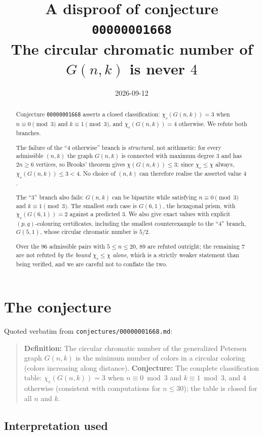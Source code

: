 \documentclass[11pt]{article}
\title{A disproof of conjecture \texttt{00000001668}\\
\large\upshape The circular chromatic number of $G(n,k)$ is never $4$}
\author{}
\date{2026-09-12}
\theoremstyle{definition}
\newcommand{\chic}{\chi_c}
\newcommand{\Gn}{G(n,k)}
\begin{document}
\maketitle

\begin{abstract}
Conjecture \texttt{00000001668} asserts a closed classification:
$\chic(\Gn) = 3$ when $n \equiv 0 \pmod 3$ and $k \equiv 1 \pmod 3$, and
$\chic(\Gn) = 4$ otherwise. We refute both branches.

The failure of the ``$4$ otherwise'' branch is \emph{structural}, not
arithmetic: for every admissible $(n,k)$ the graph $\Gn$ is connected with
maximum degree $3$ and has $2n \ge 6$ vertices, so Brooks' theorem gives
$\chi(\Gn) \le 3$; since $\chic \le \chi$ always, $\chic(\Gn) \le 3 < 4$. No
choice of $(n,k)$ can therefore realise the asserted value $4$.

The ``$3$'' branch also fails: $\Gn$ can be bipartite while satisfying
$n \equiv 0 \pmod 3$ and $k \equiv 1 \pmod 3$. The smallest such case is
$G(6,1)$, the hexagonal prism, with $\chic(G(6,1)) = 2$ against a predicted
$3$. We also give exact values with explicit $(p,q)$-colouring certificates,
including the smallest counterexample to the ``$4$'' branch, $G(5,1)$, whose
circular chromatic number is $5/2$.

Over the $96$ admissible pairs with $5 \le n \le 20$, $89$ are refuted
outright; the remaining $7$ are not refuted \emph{by the bound $\chic \le
\chi$ alone}, which is a strictly weaker statement than being verified, and we
are careful not to conflate the two.
\end{abstract}

\section{The conjecture}

Quoted verbatim from \texttt{conjectures/00000001668.md}:

\begin{quote}
\textbf{Definition:} The circular chromatic number of the generalized Petersen
graph $G(n,k)$ is the minimum number of colors in a circular coloring (colors
increasing along distance). \textbf{Conjecture:} The complete classification
table: $\chic(\Gn) = 3$ when $n \equiv 0 \bmod 3$ and $k \equiv 1 \bmod 3$, and
$4$ otherwise (consistent with computations for $n \le 30$); the table is
closed for all $n$ and $k$.
\end{quote}

\subsection*{Interpretation used}
\end{document}
